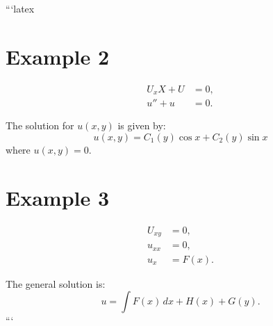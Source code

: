 ```latex
\section*{Example 2}

\begin{align}
    U_x X + U &= 0, \\
    u'' + u &= 0.
\end{align}

The solution for \( u(x, y) \) is given by:
\[
u(x, y) = C_1(y) \cos x + C_2(y) \sin x
\]
where \( u(x, y) = 0 \).

\section*{Example 3}

\begin{align}
    U_{xy} &= 0, \\
    u_{xx} &= 0, \\
    u_x &= F(x).
\end{align}

The general solution is:
\[
u = \int F(x) \, dx + H(x) + G(y).
\]
```
